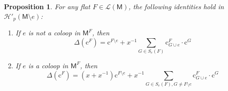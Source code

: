 \documentclass[12pt,letterpaper,english]{amsart}
\theoremstyle{teoremas}
\newtheorem{proposition}[theorem]{Proposition}
\theoremstyle{definition}
\newcommand{\M}{\mathsf{M}}
\newcommand{\cH}{\mathcal{H}}
\newcommand{\Cbasis}[1]{\mathrm{c}^{#1}}
\newcommand{\CbasisSub}[2]{\mathrm{c}^{#1}_{#2}}
\begin{document}
\begin{proposition}\label{prop:imageofDeltaCbasis}
    For any flat \(F \in \mathcal{L}(\M)\), the following identities hold in \(\cH'_p(\M \setminus e)\):
    \begin{enumerate}
        \item If \(e\) is not a coloop in \(\M^F\), then
              \begin{equation}\label{eq:imageofDeltaCbasisnoncoloop}
                  \Delta(\Cbasis{F}) = \Cbasis{F \setminus e} + x^{-1}\sum_{G \in S_e(F)}\CbasisSub{F}{G\cup e} \cdot \Cbasis{G}
              \end{equation}
        \item If \(e\) is a coloop in \(\M^F\), then
              \begin{equation}\label{eq:imageofDeltaCbasiscoloop}
                  \Delta(\Cbasis{F}) = (x+x^{-1})\Cbasis{F \setminus e} + x^{-1}\sum_{G \in S_e(F), G \neq F\setminus e}\CbasisSub{F}{G\cup e} \cdot \Cbasis{G}
              \end{equation}
    \end{enumerate}
\end{proposition}
\end{document}
